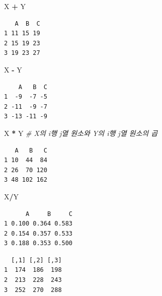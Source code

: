 \documentclass[11pt,a4paper]{book}
\newenvironment{Shaded}{\begin{snugshade}}{\end{snugshade}}
\newcommand{\StringTok}[1]{\textcolor[rgb]{0.31,0.60,0.02}{#1}}
\newcommand{\CommentTok}[1]{\textcolor[rgb]{0.56,0.35,0.01}{\textit{#1}}}
\newcommand{\OperatorTok}[1]{\textcolor[rgb]{0.81,0.36,0.00}{\textbf{#1}}}
\newcommand{\NormalTok}[1]{#1}
\theoremstyle{definition}
\theoremstyle{definition}
\theoremstyle{definition}
\theoremstyle{remark}
\begin{document}
\begin{Shaded}
\begin{Highlighting}[]
\NormalTok{X }\OperatorTok{+}\StringTok{ }\NormalTok{Y}
\end{Highlighting}
\end{Shaded}

\begin{verbatim}
   A  B  C
1 11 15 19
2 15 19 23
3 19 23 27
\end{verbatim}

\begin{Shaded}
\begin{Highlighting}[]
\NormalTok{X }\OperatorTok{-}\StringTok{ }\NormalTok{Y}
\end{Highlighting}
\end{Shaded}

\begin{verbatim}
    A   B  C
1  -9  -7 -5
2 -11  -9 -7
3 -13 -11 -9
\end{verbatim}

\begin{Shaded}
\begin{Highlighting}[]
\NormalTok{X }\OperatorTok{*}\StringTok{ }\NormalTok{Y  }\CommentTok{# X의 i행 j열 원소와 Y의 i행 j열 원소의 곱}
\end{Highlighting}
\end{Shaded}

\begin{verbatim}
   A   B   C
1 10  44  84
2 26  70 120
3 48 102 162
\end{verbatim}

\begin{Shaded}
\begin{Highlighting}[]
\NormalTok{X}\OperatorTok{/}\NormalTok{Y}
\end{Highlighting}
\end{Shaded}

\begin{verbatim}
      A     B     C
1 0.100 0.364 0.583
2 0.154 0.357 0.533
3 0.188 0.353 0.500
\end{verbatim}

\begin{Shaded}
\end{Shaded}

\begin{verbatim}
  [,1] [,2] [,3]
1  174  186  198
2  213  228  243
3  252  270  288
\end{verbatim}
\end{document}
